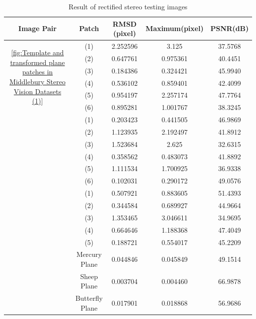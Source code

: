 \begin{table}[htbp]
	\centering
	\scriptsize   
	\begin{tabular}{ccccc}
		\toprule
		Image Pair & Patch & {\bfseries RMSD (pixel)} & {\bfseries Maximum(pixel)}&{\bfseries PSNR(dB)}\\ \midrule
		\multirow{6}{80pt}{\centering \cref{fig:Template and transformed plane patches in Middlebury Stereo Vision Datasets (1)}}&(1)&  2.252596&3.125&37.5768\\
		\addlinespace[3pt]
		&(2)  &  0.647761&0.975361&40.4451 \\
		\addlinespace[3pt]
		&(3) & 0.184386&0.324421&45.9940\\ 
		\addlinespace[3pt]
		&(4)& 0.536102&0.859401& 42.4099 \\ 
		\addlinespace[3pt]
		&(5)& 0.954197& 2.257174& 47.7764 \\ 
		\addlinespace[3pt]
		&(6)& 0.895281&1.001767& 38.3245 \\
		\addlinespace[6pt]
		
		\multirow{6}{80pt}{\centering \cref{fig:Template and transformed plane patches in Middlebury Stereo Vision Datasets (2)}}&(1)& 0.203423&0.441505&46.9869 \\
		\addlinespace[3pt]
		&(2)  & 1.123935&2.192497&41.8912 \\
		\addlinespace[3pt]
		&(3) &1.523684&2.625&32.6315 \\ 
		\addlinespace[3pt]
		&(4)&0.358562&0.483073& 41.8892 \\ 
		\addlinespace[3pt]
		&(5)& 1.111534&1.700925& 36.9338\\ 
		\addlinespace[3pt]
		&(6)&0.102031&0.290172&49.0576 \\
		\addlinespace[6pt]
		
		\multirow{5}{80pt}{\centering \cref{fig:Template and transformed plane patches in Middlebury Stereo Vision Datasets (3)}}&(1)&0.507921&0.883605& 51.4393 \\
		\addlinespace[3pt]
		&(2)  & 0.344584&0.689927&44.9664 \\
		\addlinespace[3pt]
		&(3) &1.353465&3.046611&34.9695 \\ 
		\addlinespace[3pt]
		&(4)&0.664646&1.188368& 47.4049 \\ 
		\addlinespace[3pt]
		&(5)& 0.188721&0.554017& 45.2209\\ 		
		\addlinespace[6pt]
		
		\multirow{3}{80pt}{\centering \cref{fig:Result of Self-built Stereo Images}}&Mercury Plane& 0.044846&0.045849&49.1514 \\
		\addlinespace[3pt]
		&Sheep Plane  &  0.003704&0.004460&66.9878\\
		\addlinespace[3pt]
		&Butterfly Plane &  0.017901&0.018868&56.9686 \\ 		
		\bottomrule
	\end{tabular}
	\caption{Result of rectified stereo testing images}  
	\label{tab:Result of rectified stereo testing images} 
\end{table}

